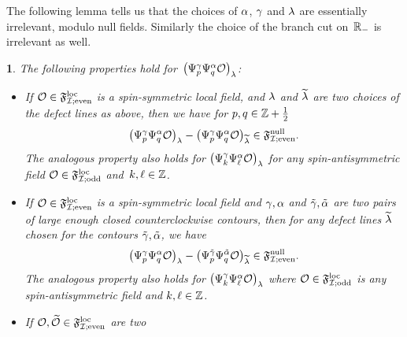 \documentclass[12pt,oneside,english]{amsart}
\numberwithin{equation}{section}
\numberwithin{figure}{section}
\theoremstyle{plain}
\theoremstyle{plain}
\theoremstyle{plain}
\theoremstyle{plain}
\newtheorem{lem}[thm]{\protect\lemmaname}
\theoremstyle{remark}
\theoremstyle{definition}
\theoremstyle{plain}
\theoremstyle{plain}
\numberwithin{thm}{section}
\providecommand{\lemmaname}{Lemma}
\providecommand{\lemmaname}{Lemma}
\providecommand{\lemmaname}{Lemma}
\providecommand{\lemmaname}{Lemma}
\begin{document}
The following lemma tells us that the choices of $\alpha$, $\gamma$
and ${\lambda}$ are essentially irrelevant, modulo null fields. Similarly
the choice of the branch cut on~$\mathbb{R}_{-}$ is irrelevant as
well.
\begin{lem}
\label{lem:equivalence-fermion-modes-local-fields}
The following properties hold 
for~$\left( {\Psi}_{p}^{\gamma}{\Psi}_{q}^{\alpha} {\mathcal{O}} 
\right)_{{\lambda}}$:
\begin{itemize}
\item[(a)]
If ${\mathcal{O}} \in \mathfrak{F}^\mathrm{loc}_{\mathcal{I}; \mathrm{even}}$ is a
spin-symmetric local field, and ${\lambda}$ and $\widetilde{{\lambda}}$ are 
two choices of the defect lines as above,
then we have for $p,q \in \mathbb{Z} + \frac{1}{2}$
\[ \big( {\Psi}^{\gamma}_{p} {\Psi}^{\alpha}_{q}
    {\mathcal{O}} \big)_{{\lambda}} -
\big( {\Psi}^{\gamma}_{p} {\Psi}^{\alpha}_{q}
    {\mathcal{O}} \big)_{\widetilde{{\lambda}}} \in \mathfrak{F}^\mathrm{null}_{\mathcal{I}; \mathrm{even}} . \]
The analogous property also holds for
$\big( {\Psi}^{\gamma}_{k} {\Psi}^{\alpha}_{\ell}
    {\mathcal{O}} \big)_{{\lambda}}$
for any spin-antisymmetric field
${{\mathcal{O}} \in \mathfrak{F}^\mathrm{loc}_{\mathcal{I}; \mathrm{odd}}}$ and~$k,\ell \in \mathbb{Z}$.
\item[(b)] If ${\mathcal{O}} \in \mathfrak{F}^\mathrm{loc}_{\mathcal{I}; \mathrm{even}}$ is a spin-symmetric local 
field and $\gamma,\alpha$ and $\tilde{\gamma},{\tilde{\alpha}}$ are two
pairs of large enough
closed counterclockwise contours, then
for any defect lines $\widetilde{{\lambda}}$ chosen for the 
contours $\tilde{\gamma},{\tilde{\alpha}}$, we have
\[ \big( {\Psi}^{\gamma}_{p} {\Psi}^{\alpha}_{q}
    {\mathcal{O}} \big)_{{\lambda}} -
\big( {\Psi}^{\tilde{\gamma}}_{p} {\Psi}^{{\tilde{\alpha}}}_{q}
    {\mathcal{O}} \big)_{\widetilde{{\lambda}}} \in \mathfrak{F}^\mathrm{null}_{\mathcal{I}; \mathrm{even}} . \]
The analogous property also holds for
$\big( {\Psi}^{\gamma}_{k} {\Psi}^{\alpha}_{\ell}
    {\mathcal{O}} \big)_{{\lambda}}$
where ${{\mathcal{O}} \in \mathfrak{F}^\mathrm{loc}_{\mathcal{I}; \mathrm{odd}}}$ is any spin-antisymmetric field and 
$k,\ell \in \mathbb{Z}$.
\item[(c)]
If ${\mathcal{O}}, \widetilde{{\mathcal{O}}} \in \mathfrak{F}^\mathrm{loc}_{\mathcal{I}; \mathrm{even}}$ are two

\end{itemize}
\end{lem}
\end{document}
